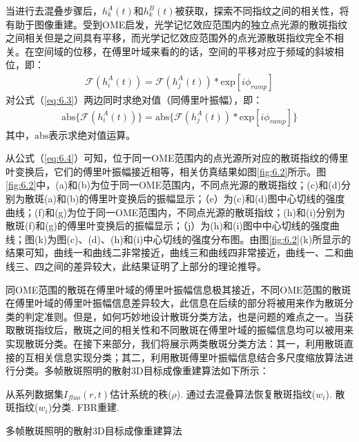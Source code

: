 当进行去混叠步骤后，$h_{k}^{A}(t)$和$h_{k}^{B}(t)$被获取，探索不同指纹之间的相关性，将有助于图像重建。受到OME启发，光学记忆效应范围内的独立点光源的散斑指纹之间相关但是之间具有平移\cite{Freund1988}，而光学记忆效应范围外的点光源散斑指纹完全不相关。在空间域的位移，在傅里叶域来看的的话，空间的平移对应于频域的斜坡相位，即：
\begin{equation}
\begin{aligned}
\mathcal{F}(h_i^{A}(t)) = \mathcal{F}(h_j^{A}(t))*\mbox{exp}[i\phi_{ramp}]
\label{eq:6.3}
\end{aligned}
\end{equation} 对公式（\ref{eq:6.3}）两边同时求绝对值（同傅里叶振幅），即：
\begin{equation}
\begin{aligned}
\mbox{abs} \{ \mathcal{F}(h_i^{A}(t)) \} = \mbox{abs} \{  \mathcal{F}(h_j^{A}(t))*\mbox{exp}[i\phi_{ramp}] \}
\label{eq:6.4}
\end{aligned}
\end{equation}其中，$\mbox{abs}$表示求绝对值运算。

从公式（\ref{eq:6.4}）可知，位于同一OME范围内的点光源所对应的散斑指纹的傅里叶变换后，它们的傅里叶振幅接近相等，相关仿真结果如图\ref{fig:6.2}所示。图\ref{fig:6.2}中，(a)和(b)为位于同一OME范围内，不同点光源的散斑指纹；(c)和(d)分别为散斑(a)和(b)的傅里叶变换后的振幅显示；（e）为(c)和(d)图中心切线的强度曲线；(f)和(g)为位于同一OME范围内，不同点光源的散斑指纹；(h)和(i)分别为散斑(f)和(g)的傅里叶变换后的振幅显示；（j）为(h)和(i)图中中心切线的强度曲线；图(k)为图(c)、(d)、(h)和(i)中心切线的强度分布图。由图\ref{fig:6.2}(k)所显示的结果可知，曲线一和曲线二非常接近，曲线三和曲线四非常接近，曲线一、二和曲线三、四之间的差异较大，此结果证明了上部分的理论推导。

同OME范围的散斑在傅里叶域的傅里叶振幅信息极其接近，不同OME范围的散斑在傅里叶域的傅里叶振幅信息差异较大，此信息在后续的部分将被用来作为散斑分类的判定准则。但是，如何巧妙地设计散斑分类方法，也是问题的难点之一。当获取散斑指纹后，散斑之间的相关性和不同散斑在傅里叶域的振幅信息均可以被用来实现散斑分类。在接下来部分，我们将展示两类散斑分类方法：其一，利用散斑直接的互相关信息实现分类；其二，利用散斑傅里叶振幅信息结合多尺度缩放算法进行分类。多帧散斑照明的散射3D目标成像重建算法如下所示：

\begin{algorithm2e}[htp]
\DontPrintSemicolon
\SetAlgoLined
{}
从系列数据集$I_{fluo}(r,t)$估计系统的秩($\rho$).\;
通过去混叠算法恢复散斑指纹($w_{i}$).\;
散斑指纹($w_{i}$)分类.\;
FBR重建.\;
\caption{多帧散斑照明的散射3D目标成像重建算法}
\label{alg:a2}
\end{algorithm2e}

